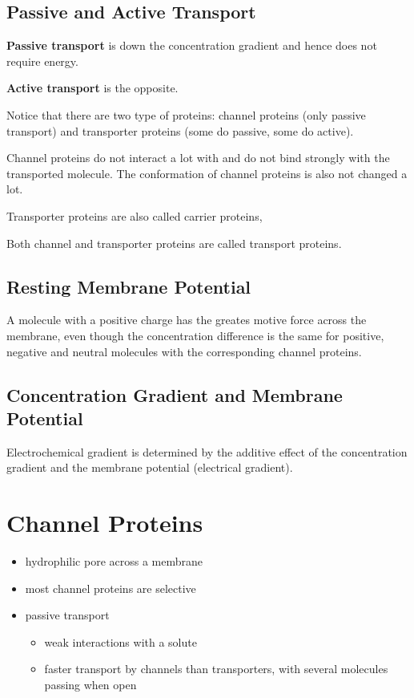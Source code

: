 \documentclass[11pt]{scrartcl}
\begin{document}
\subsection{Passive and Active Transport}

\textbf{Passive transport} is down the concentration gradient and hence does not require energy.

\textbf{Active transport} is the opposite.

Notice that there are two type of proteins: channel proteins (only passive transport) and transporter proteins (some do passive, some do active).

Channel proteins do not interact a lot with and do not bind strongly with the transported molecule. The conformation of channel proteins is also not changed a lot.

Transporter proteins are also called carrier proteins,

Both channel and transporter proteins are called transport proteins.

\subsection{Resting Membrane Potential}

A molecule with a positive charge has the greates motive force across
the membrane, even though the concentration difference is the same for
positive, negative and neutral molecules with the corresponding channel proteins.

\subsection{Concentration Gradient and Membrane Potential}

Electrochemical gradient is determined by the additive effect of the
concentration gradient and the membrane potential (electrical
gradient).

\section{Channel Proteins}

\begin{itemize}
\item hydrophilic pore across a membrane
\item most channel proteins are selective
\item passive transport

  \begin{itemize}
\item weak interactions with a solute
\item faster transport by channels than transporters, with several
  molecules passing when open
\end{itemize}
\end{itemize}
\end{document}

